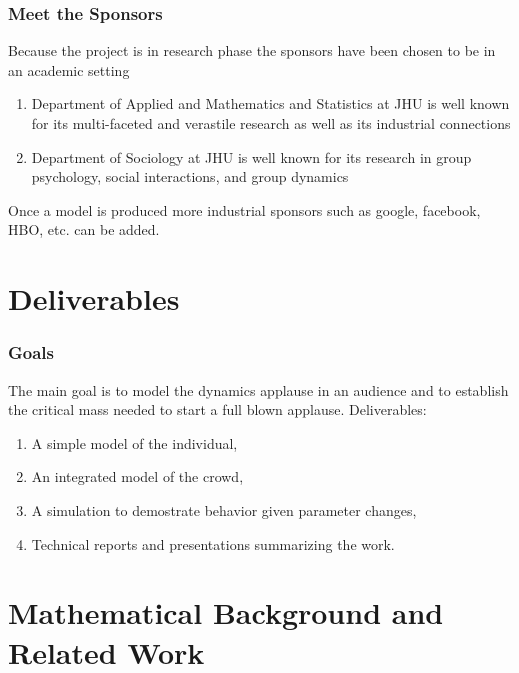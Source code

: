 \documentclass[compress,handout,10pt]{beamer}
\let\olditem\item
\renewcommand{\item}{\setlength{\itemsep}{0.5\baselineskip}\olditem}
\begin{document}
\begin{frame}
  \frametitle{Meet the Sponsors}
   Because the project is in research phase the sponsors have been chosen to be in an academic setting
	\begin{enumerate}
		\item Department of Applied and Mathematics and Statistics at JHU\newline \newline
	is well known for its multi-faceted and verastile research as well as its industrial connections		
		\item Department of Sociology at JHU\newline \newline
	is well known for its research in group psychology, social interactions, and group dynamics
	\end{enumerate} 
\vspace{7pt}

Once a model is produced more industrial sponsors such as google, facebook, HBO, etc. can be added.

\end{frame}

\section{Deliverables}

\begin{frame}
   \frametitle{Goals}
   The main goal is to model the dynamics applause in an audience and to establish the critical mass needed to start a full blown applause.\newline\newline
 Deliverables:
 \vspace{7pt}
	\begin{enumerate}
		\item A simple model of the individual,
		\item An integrated model of the crowd,
		\item A simulation to demostrate behavior given parameter changes,
		\item Technical reports and presentations summarizing the work.
	\end{enumerate}



\end{frame}


\section {Mathematical Background and Related Work}
\end{document}
